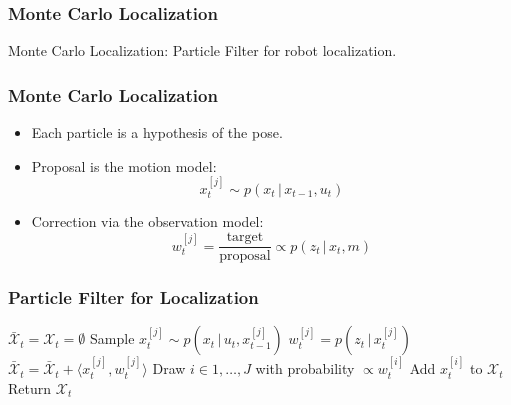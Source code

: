 \begin{frame}
    \frametitle{Monte Carlo Localization}
    Monte Carlo Localization: Particle Filter for robot localization.
\end{frame}

\begin{frame}
    \frametitle{Monte Carlo Localization}
    \begin{itemize}
        \item Each particle is a hypothesis of the pose.
        \item Proposal is the motion model:
        \begin{equation*}
            x_t^{[j]} \sim p(x_t \, | \, x_{t-1}, u_t)
        \end{equation*}
        \item Correction via the observation model:
        \begin{equation*}
            w_t^{[j]} = \frac{\text{target}}{\text{proposal}} \propto p(z_t \, | \, x_t, m)
        \end{equation*}
    \end{itemize}
\end{frame}

\begin{frame}
    \frametitle{Particle Filter for Localization}
    \begin{algorithmic}[1]
        \State $\bar{\mathcal{X}}_t = \mathcal{X}_t = \emptyset$
            \State Sample $x_t^{[j]} \sim p(x_t \, | \, u_t, x_{t-1}^{[j]})$
            \State $w_t^{[j]} = p(z_t \, | \, x_t^{[j]})$
            \State $\bar{\mathcal{X}}_t = \bar{\mathcal{X}}_t + \langle x_t^{[j]}, w_t^{[j]}\rangle$
        \EndFor
            \State Draw $i \in 1,\ldots,J$ with probability $\propto w_t^{[i]}$
            \State Add $x_t^{[i]}$ to $\mathcal{X}_t$
        \EndFor
        \State Return $\mathcal{X}_t$
        \EndProcedure
    \end{algorithmic}
\end{frame}

